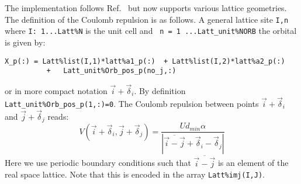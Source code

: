 The implementation follows Ref.~\cite{Hohenadler14}  but now supports various lattice geometries.    The definition of  the Coulomb repulsion is as follows. 
A general lattice site  \texttt{I,n}   where \texttt{I: 1...Latt\%N} is the unit cell and \texttt{ n = 1 ...Latt\_unit\%NORB}  the orbital  is given by: 
\begin{lstlisting}
X_p(:) = Latt%list(I,1)*latt%a1_p(:)  + Latt%list(I,2)*latt%a2_p(:) 
          +   Latt_unit%Orb_pos_p(no_j,:)
\end{lstlisting}
or in more compact notation $ \vec{i}  + \vec{\delta}_i $.   By definition \texttt{Latt\_unit\%Orb\_pos\_p(1,:)=0}.
The Coulomb repulsion between points   $ \vec{i}  + \vec{\delta}_i $   and $ \vec{j}  + \vec{\delta}_j $   reads: 
\begin{equation}
	V(\vec{i}  + \vec{\delta}_i ,  \vec{j}  + \vec{\delta}_j  )  =  \frac{U d_{min} \alpha}{  |  \overline{\vec{i} - \vec{j}} + \vec{\delta}_i - \vec{\delta}_j  |}  
\end{equation}
Here  we use periodic boundary conditions such that  $\overline{\vec{i} - \vec{j}}$  is an element of the real space lattice. Note that this is encoded in the array \texttt{Latt\%imj(I,J)}.


